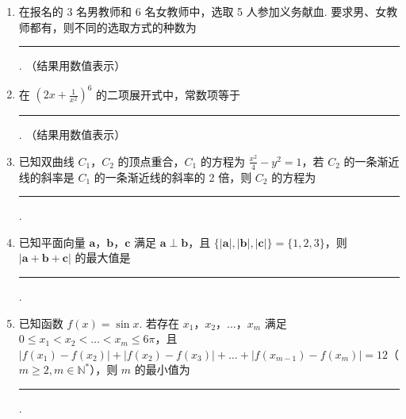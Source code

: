 \begin{description}
\begin{enumerate}[leftmargin=5pt]
        \item 在报名的 3 名男教师和 6 名女教师中，选取 5 人参加义务献血. 要求男、女教师都有，则不同的选取方式的种数为\rule[-0.3ex]{3em}{0.4pt}. （结果用数值表示）

        \item 在 \(\left(2x + \frac{1}{x^2}\right)^6\) 的二项展开式中，常数项等于\rule[-0.3ex]{3em}{0.4pt}. （结果用数值表示）

        \item 已知双曲线 \(C_1\)，\(C_2\) 的顶点重合，\(C_1\) 的方程为 \(\frac{x^2}{4} - y^2 = 1\)，若 \(C_2\) 的一条渐近线的斜率是 \(C_1\) 的一条渐近线的斜率的 2 倍，则 \(C_2\) 的方程为\rule[-0.3ex]{3em}{0.4pt}.

        \item 已知平面向量 \(\bm{a}\)，\(\bm{b}\)，\(\bm{c}\) 满足 \(\bm{a} \perp \bm{b}\)，且 \(\{|\bm{a}|, |\bm{b}|, |\bm{c}|\} = \{1, 2, 3\}\)，则 \(|\bm{a} + \bm{b} + \bm{c}|\) 的最大值是\rule[-0.3ex]{3em}{0.4pt}.

        \item 已知函数 \( f(x) = \sin x \). 若存在 \(x_1\)，\(x_2\)，\(\dots\)，\(x_m\) 满足 \( 0 \leqslant x_1 < x_2 < \dots < x_m \leqslant 6\pi \)，且 \(|f(x_1) - f(x_2)| + |f(x_2) - f(x_3)| + \dots + |f(x_{m-1}) - f(x_m)| = 12\)（\(m \geqslant 2, m \in \mathbb{N}^*\)），则 \( m \) 的最小值为\rule[-0.3ex]{3em}{0.4pt}.

    \end{enumerate}

\end{description}

